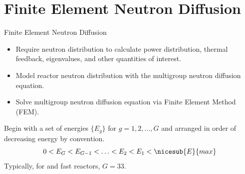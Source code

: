 \section{Finite Element Neutron Diffusion}
\label{sec:neutronDiffusion}

\begin{frame}{Finite Element Neutron Diffusion}
  \begin{itemize}
    \item Require neutron distribution to calculate power distribution, thermal
      feedback, eigenvalues, and other quantities of interest.
    \item Model reactor neutron distribution with the multigroup neutron
      diffusion equation.
    \item Solve multigroup neutron diffusion equation via Finite Element Method
      (FEM).
  \end{itemize}

  Begin with a set of energies $\{E_g\}$ for $g = 1,2,\ldots,G$ and arranged in
  order of decreasing energy by convention.
  \begin{equation}
    0 < E_G < E_{G-1} < \ldots < E_2 < E_1 < \nicesub{E}{max}
  \end{equation}
  Typically, for \mcc and fast reactors, $G=33$.
\end{frame}

